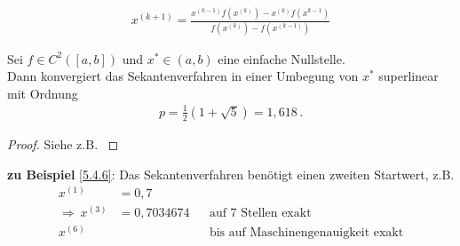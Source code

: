 \begin{gather}
x^{(k+1)} = \frac{x^{(k-1)}f(x^{(k)}) - x^{(k)}f(x^{k-1})}{f(x^{(k)})-f(x^{(k-1)})}
\label{V.4.2}
\end{gather}



\begin{Satze}
	Sei $f\in C^2([a,b])$ und $x^{*}\in (a,b)$ eine einfache Nullstelle.\\
	Dann konvergiert das Sekantenverfahren in einer Umbegung von $x^{*}$
	superlinear mit Ordnung 
	\begin{gather*}
	p=\frac{1}{2}(1+\sqrt{5})= 1,618 \, .
	\end{gather*}
\end{Satze}

\begin{proof}
	Siehe z.B. \cite[][Zwischenwertsatz, Fibonacci-Folge]{haemmerlinhoffmann,stoerbulirsch}
\end{proof}

\textbf{zu Beispiel} \ref{5.4.6}: Das Sekantenverfahren benötigt
einen zweiten Startwert, z.B.
\begin{align*}
x^{(1)}&=0,7 \\
\Rightarrow ~ x^{(3)} &= 0,7034674 
&&\text{auf 7 Stellen exakt}\\
x^{(6)} &&& \text{bis auf Maschinengenauigkeit exakt}
\end{align*}


